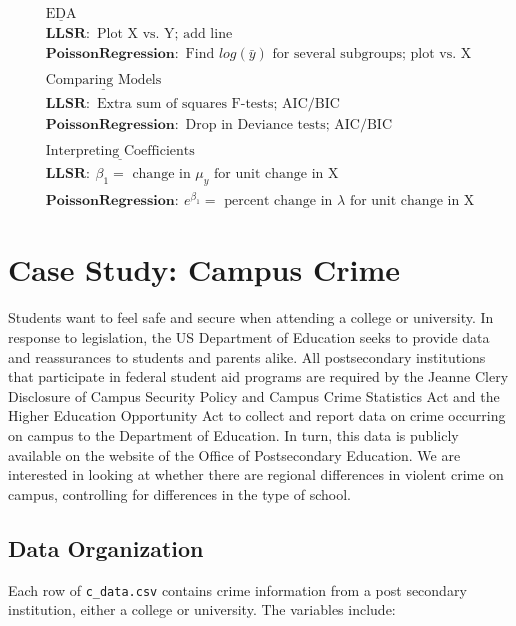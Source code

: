 \documentclass[
]{krantz}
\begin{document}
\begin{gather*}
\underline{\textrm{EDA}} \\
\mathbf{LLSR:}\textrm{ Plot X vs. Y; add line} \\
\mathbf{Poisson Regression:}\textrm{ Find }log(\bar{y})\textrm{ for several subgroups; plot vs. X} \\
\textrm{ } \\
\underline{\textrm{Comparing Models}} \\
\mathbf{LLSR:}\textrm{ Extra sum of squares F-tests; AIC/BIC} \\
\mathbf{Poisson Regression:}\textrm{ Drop in Deviance tests; AIC/BIC} \\
\textrm{ } \\
\underline{\textrm{Interpreting Coefficients}} \\
\mathbf{LLSR:}\ \beta_1=\textrm{ change in }\mu_y\textrm{ for unit change in X} \\
\mathbf{Poisson Regression:}\ e^{\beta_1}=\textrm{ percent change in }\lambda\textrm{ for unit change in X} 
\end{gather*}

\section{Case Study: Campus Crime}\label{case-study-campus-crime}

Students want to feel safe and secure when attending a college or university. In response to legislation, the US Department of Education seeks to provide data and reassurances to students and parents alike. All postsecondary institutions that participate in federal student aid programs are required by the Jeanne Clery Disclosure of Campus Security Policy and Campus Crime Statistics Act and the Higher Education Opportunity Act to collect and report data on crime occurring on campus to the Department of Education. In turn, this data is publicly available on the website of the Office of Postsecondary Education. We are interested in looking at whether there are regional differences in violent crime on campus, controlling for differences in the type of school.

\subsection{Data Organization}\label{data-organization-1}

Each row of \texttt{c\_data.csv} contains crime information from a post secondary institution, either a college or university. The variables include:
\end{document}
